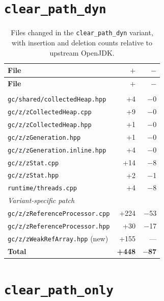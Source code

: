\section{\texttt{clear\_path\_dyn}}

\begin{longtable}[c]{lrr}
\caption[File changes in \texttt{clear\_path\_dyn}]{Files changed in the \texttt{clear\_path\_dyn} variant, with insertion and deletion counts relative to upstream OpenJDK.} \label{tab:patch-clear-path-dyn} \\
\toprule
\textbf{File} & \textbf{$+$} & \textbf{$-$} \\
\midrule
\endfirsthead
\toprule
\textbf{File} & \textbf{$+$} & \textbf{$-$} \\
\midrule
\endhead
\bottomrule
\endfoot
\multicolumn{3}{l}{\textit{Base patch}} \\
\texttt{gc/shared/collectedHeap.hpp}     & +4  & $-$0 \\
\texttt{gc/z/zCollectedHeap.cpp}         & +9  & $-$0 \\
\texttt{gc/z/zCollectedHeap.hpp}         & +1  & $-$0 \\
\texttt{gc/z/zGeneration.hpp}            & +1  & $-$0 \\
\texttt{gc/z/zGeneration.inline.hpp}     & +4  & $-$0 \\
\texttt{gc/z/zStat.cpp}                  & +14 & $-$8 \\
\texttt{gc/z/zStat.hpp}                  & +2  & $-$1 \\
\texttt{runtime/threads.cpp}             & +4  & $-$8 \\
\multicolumn{3}{l}{\textit{Variant-specific patch}} \\
\texttt{gc/z/zReferenceProcessor.cpp}   & +224 & $-$53 \\
\texttt{gc/z/zReferenceProcessor.hpp}   & +30  & $-$17 \\
\texttt{gc/z/zWeakRefArray.hpp} (new)   & +155 & --- \\
\midrule
\textbf{Total} & \textbf{+448} & \textbf{$-$87} \\
\end{longtable}

\section{\texttt{clear\_path\_only}}

